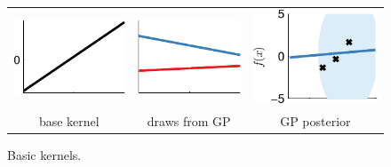 \begin{figure}
\begin{tabular}{c|c|c}
\includegraphics[width=\fwb]{../figures/structure_examples/lin_kernel} &  \includegraphics[width=\fwb]{../figures/structure_examples/lin_kernel_draws} & \includegraphics[width=\fwb]{../figures/structure_examples/lin_kernel_post} \\
base kernel & draws from GP & GP posterior
\end{tabular}
\caption{ Basic kernels.}
\label{fig:basic_kernels}
\end{figure}